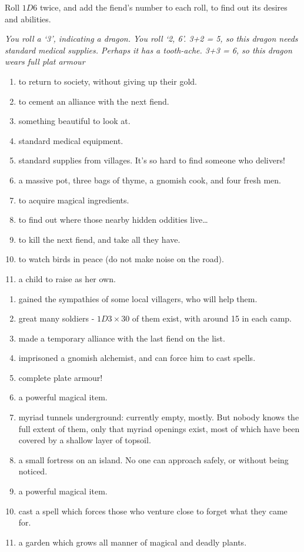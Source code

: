 \begin{multicols}{2}
Roll $1D6$ twice, and add the fiend's number to each roll, to find out its desires and abilities.

\emph{You roll a `3', indicating a dragon. You roll `2, 6'. 3+2 = 5, so
this dragon needs standard medical supplies. Perhaps it has a
tooth-ache. 3+3 = 6, so this dragon wears full plat armour}


\begin{enumerate}
\item
  to return to society, without giving up their gold.
\item
  to cement an alliance with the next fiend.
\item
  something beautiful to look at.
\item
  standard medical equipment.
\item
  standard supplies from villages. It's so hard to find someone who
  delivers!
\item
  a massive pot, three bags of thyme, a gnomish cook, and four fresh
  men.
\item
  to acquire magical ingredients.
\item
  to find out where those nearby hidden oddities live\ldots{}
\item
  to kill the next fiend, and take all they have.
\item
  to watch birds in peace (do not make noise on the road).
\item
  a child to raise as her own.
\end{enumerate}


\begin{enumerate}
\item
  gained the sympathies of some local villagers, who will help them.
\item
  great many soldiers - $1D3 \times 30$ of them exist, with around 15 in each
  camp.
\item
  made a temporary alliance with the last fiend on the list.
\item
  imprisoned a gnomish alchemist, and can force him to cast spells.
\item
  complete plate armour!
\item
  a powerful magical item.
\item
  myriad tunnels underground: currently empty, mostly. But nobody knows
  the full extent of them, only that myriad openings exist, most of
  which have been covered by a shallow layer of topsoil.
\item
  a small fortress on an island. No one can approach safely, or without
  being noticed.
\item
  a powerful magical item.
\item
  cast a spell which forces those who venture close to forget what they
  came for.
\item
  a garden which grows all manner of magical and deadly plants.
\end{enumerate}


\end{multicols}
